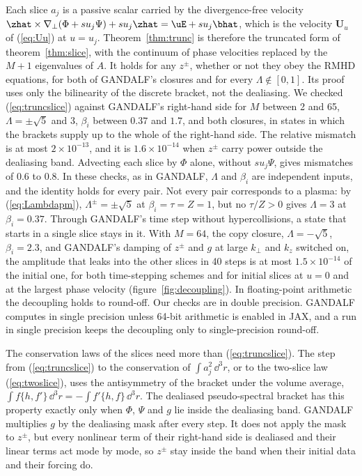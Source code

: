 Each slice $a_j$ is a passive scalar carried by the divergence-free velocity $\zhat\times\nabla_\perp(\Phi+su_j\Psi)+su_j\zhat=\uE+su_j\bhat$, which is the velocity $\boldsymbol U_u$ of (\ref{eq:Uu}) at $u=u_j$. Theorem~\ref{thm:trunc} is therefore the truncated form of theorem~\ref{thm:slice}, with the continuum of phase velocities replaced by the $M+1$ eigenvalues of $A$. It holds for any $z^\pm$, whether or not they obey the RMHD equations, for both of GANDALF's closures and for every $\Lambda\notin[0,1]$. Its proof uses only the bilinearity of the discrete bracket, not the dealiasing. We checked (\ref{eq:truncslice}) against GANDALF's right-hand side for $M$ between 2 and 65, $\Lambda=\pm\sqrt5$ and $3$, $\beta_i$ between $0.37$ and $1.7$, and both closures, in states in which the brackets supply up to the whole of the right-hand side. The relative mismatch is at most $2\times10^{-13}$, and it is $1.6\times10^{-14}$ when $z^\pm$ carry power outside the dealiasing band. Advecting each slice by $\Phi$ alone, without $su_j\Psi$, gives mismatches of $0.6$ to $0.8$. In these checks, as in GANDALF, $\Lambda$ and $\beta_i$ are independent inputs, and the identity holds for every pair. Not every pair corresponds to a plasma: by (\ref{eq:Lambdapm}), $\Lambda^\pm=\pm\sqrt5$ at $\beta_i=\tau=Z=1$, but no $\tau/Z>0$ gives $\Lambda=3$ at $\beta_i=0.37$. Through GANDALF's time step without hypercollisions, a state that starts in a single slice stays in it. With $M=64$, the copy closure, $\Lambda=-\sqrt5$, $\beta_i=2.3$, and GANDALF's damping of $z^\pm$ and $g$ at large $k_\perp$ and $k_z$ switched on, the amplitude that leaks into the other slices in 40 steps is at most $1.5\times10^{-14}$ of the initial one, for both time-stepping schemes and for initial slices at $u=0$ and at the largest phase velocity (figure~\ref{fig:decoupling}). In floating-point arithmetic the decoupling holds to round-off. Our checks are in double precision. GANDALF computes in single precision unless 64-bit arithmetic is enabled in JAX, and a run in single precision keeps the decoupling only to single-precision round-off.

The conservation laws of the slices need more than (\ref{eq:truncslice}). The step from (\ref{eq:truncslice}) to the conservation of $\int a_j^2\,\dd^3r$, or to the two-slice law (\ref{eq:twoslice}), uses the antisymmetry of the bracket under the volume average, $\int f\{h,f'\}\,\dd^3r=-\int f'\{h,f\}\,\dd^3r$. The dealiased pseudo-spectral bracket has this property exactly only when $\Phi$, $\Psi$ and $g$ lie inside the dealiasing band. GANDALF multiplies $g$ by the dealiasing mask after every step. It does not apply the mask to $z^\pm$, but every nonlinear term of their right-hand side is dealiased and their linear terms act mode by mode, so $z^\pm$ stay inside the band when their initial data and their forcing do.

